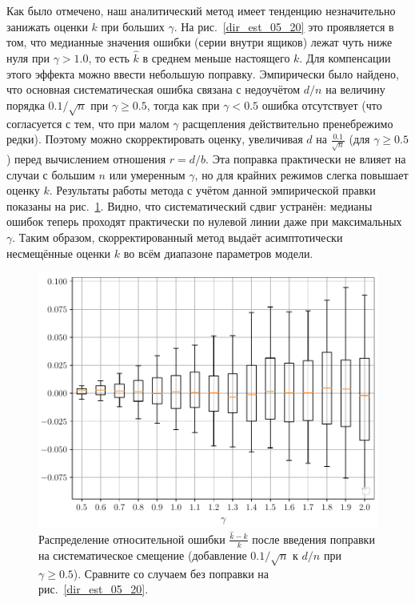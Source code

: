 Как было отмечено, наш аналитический метод имеет тенденцию незначительно занижать оценки $k$ при больших $\gamma$. На рис.~\ref{dir_est_05_20} это проявляется в том, что медианные значения ошибки (серии внутри ящиков) лежат чуть ниже нуля при $\gamma > 1.0$, то есть $\hat{k}$ в среднем меньше настоящего $k$. Для компенсации этого эффекта можно ввести небольшую поправку. Эмпирически было найдено, что основная систематическая ошибка связана с недоучётом $d/n$ на величину порядка $0.1/\sqrt{n}$ при $\gamma \ge 0.5$, тогда как при $\gamma < 0.5$ ошибка отсутствует (что согласуется с тем, что при малом $\gamma$ расщепления действительно пренебрежимо редки). Поэтому можно скорректировать оценку, увеличивая $d$ на $\frac{0.1}{\sqrt{n}}$ (для $\gamma \ge 0.5$) перед вычислением отношения $r = d/b$. Эта поправка практически не влияет на случаи с большим $n$ или умеренным $\gamma$, но для крайних режимов слегка повышает оценку $k$. Результаты работы метода с учётом данной эмпирической правки показаны на рис.~\ref{dir_est_05_20_buffed}. Видно, что систематический сдвиг устранён: медианы ошибок теперь проходят практически по нулевой линии даже при максимальных $\gamma$. Таким образом, скорректированный метод выдаёт асимптотически несмещённые оценки $k$ во всём диапазоне параметров модели.

\begin{figure}[h!]
    \centering
    \includegraphics[width=0.8\linewidth]{images/part2/dir_est_05_20_buffed.pdf}
    \caption{Распределение относительной ошибки $\frac{\hat{k} - k}{\,k}$ после введения поправки на систематическое смещение (добавление $0.1/\sqrt{n}$ к $d/n$ при $\gamma \ge 0.5$). Сравните со случаем без поправки на рис.~\ref{dir_est_05_20}.}
    \label{dir_est_05_20_buffed}
\end{figure}

